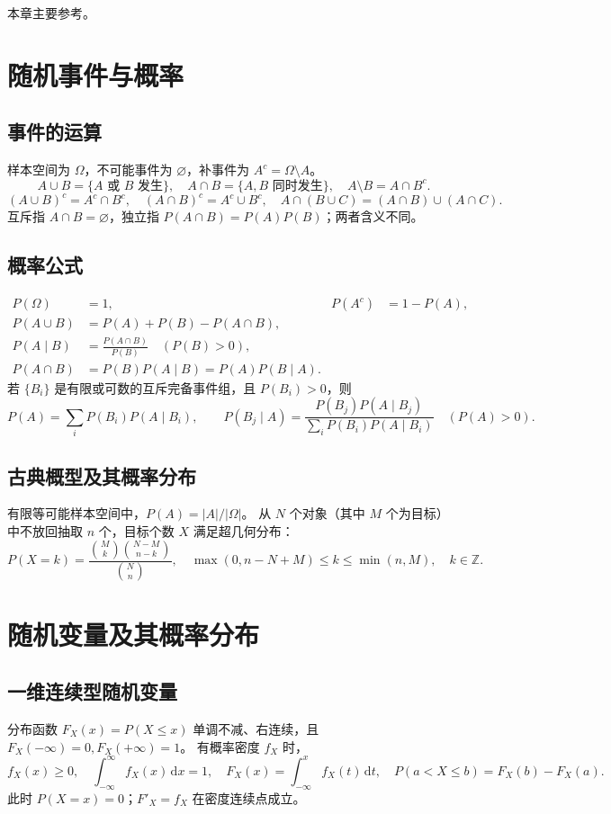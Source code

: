 \documentclass[../main.tex]{subfiles}
\begin{document}
本章主要参考\cite{durrett}。

\section{随机事件与概率}
\subsection{事件的运算}
样本空间为 $\Omega$，不可能事件为 $\varnothing$，补事件为 $A^c=\Omega\setminus A$。
\[
A\cup B=\{A\text{ 或 }B\text{ 发生}\},\quad A\cap B=\{A,B\text{ 同时发生}\},\quad
A\setminus B=A\cap B^c.
\]
\[
(A\cup B)^c=A^c\cap B^c,\quad (A\cap B)^c=A^c\cup B^c,\quad
A\cap(B\cup C)=(A\cap B)\cup(A\cap C).
\]
互斥指 $A\cap B=\varnothing$，独立指 $P(A\cap B)=P(A)P(B)$；两者含义不同。
\subsection{概率公式}
\begin{align*}
P(\Omega)&=1, & P(A^c)&=1-P(A),\\
P(A\cup B)&=P(A)+P(B)-P(A\cap B),\\
P(A\mid B)&=\frac{P(A\cap B)}{P(B)}\quad(P(B)>0),\\
P(A\cap B)&=P(B)P(A\mid B)=P(A)P(B\mid A).
\end{align*}
若 $\{B_i\}$ 是有限或可数的互斥完备事件组，且 $P(B_i)>0$，则
\[
P(A)=\sum_iP(B_i)P(A\mid B_i),\qquad
P(B_j\mid A)=\frac{P(B_j)P(A\mid B_j)}{\sum_iP(B_i)P(A\mid B_i)}\quad(P(A)>0).
\]
\subsection{古典概型及其概率分布}
有限等可能样本空间中，$P(A)=|A|/|\Omega|$。
从 $N$ 个对象（其中 $M$ 个为目标）中不放回抽取 $n$ 个，目标个数 $X$ 满足超几何分布：
\[
P(X=k)=\frac{\binom Mk\binom{N-M}{n-k}}{\binom Nn},\quad
\max(0,n-N+M)\le k\le\min(n,M),\quad k\in\mathbb Z.
\]
\section{随机变量及其概率分布}
\subsection{一维连续型随机变量}
分布函数 $F_X(x)=P(X\le x)$ 单调不减、右连续，且 $F_X(-\infty)=0,F_X(+\infty)=1$。
有概率密度 $f_X$ 时，
\[
f_X(x)\ge0,\quad\int_{-\infty}^{\infty}f_X(x)\,\mathrm dx=1,\quad
F_X(x)=\int_{-\infty}^xf_X(t)\,\mathrm dt,\quad
P(a<X\le b)=F_X(b)-F_X(a).
\]
此时 $P(X=x)=0$；$F'_X=f_X$ 在密度连续点成立。
\end{document}

